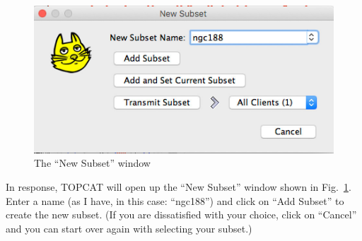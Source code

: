 \documentclass[twocolumn,apj]{openjournal}
\begin{document}
\begin{figure}[htbp]
\begin{center}
\includegraphics[width=\linewidth]{subsetWindow.jpg}
\caption{The ``New Subset'' window}
\label{SubsetWindow}
\end{center}
\end{figure}
In response, TOPCAT will open up the ``New Subset'' window shown in Fig.~\ref{SubsetWindow}. Enter a name (as I have, in this case: ``ngc188'') and click on ``Add Subset'' to create the new subset. (If you are dissatisfied with your choice, click on ``Cancel'' and you can start over again with selecting your subset.)
\end{document}
